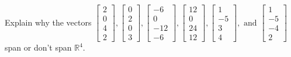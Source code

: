 \documentclass{article}
\begin{document}
\begin{exerciseStatement}
    Explain why the vectors \(\left[\begin{array}{r}
2 \\
0 \\
4 \\
2
\end{array}\right] , \left[\begin{array}{r}
0 \\
2 \\
0 \\
3
\end{array}\right] , \left[\begin{array}{r}
-6 \\
0 \\
-12 \\
-6
\end{array}\right] , \left[\begin{array}{r}
12 \\
0 \\
24 \\
12
\end{array}\right] , \left[\begin{array}{r}
1 \\
-5 \\
3 \\
4
\end{array}\right] , \text{ and } \left[\begin{array}{r}
1 \\
-5 \\
-4 \\
2
\end{array}\right]\) span or don't span \(\mathbb{R}^4\).



  
\end{exerciseStatement}
\end{document}
